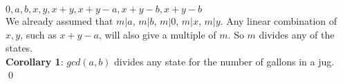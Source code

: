 \documentclass{article}
\begin{document}
	$0, a, b, x, y, x + y, x + y - a, x + y - b, x + y - b$
	\\
	We already assumed that $m | a$, $m | b$, $m | 0$, $m | x$, $m | y$. Any linear combination of $x, y$, such as $x + y - a$, will also give a multiple of $m$. So $m$ divides any of the states.
	\\
	\textbf{Corollary 1}: $gcd(a, b)$ divides any state for the number of gallons in a jug.
	\\
	\qed
\end{document}
